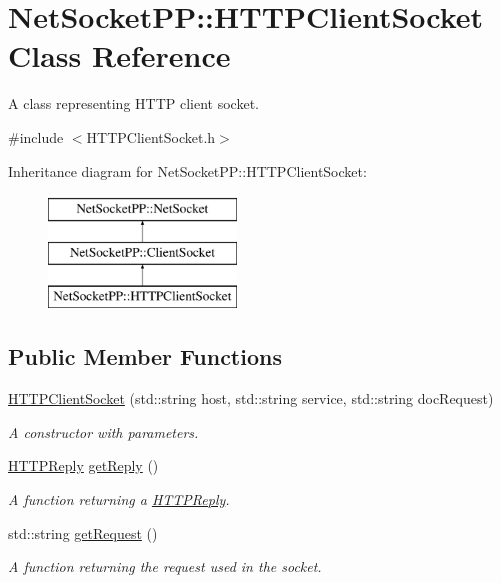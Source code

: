 \hypertarget{class_net_socket_p_p_1_1_h_t_t_p_client_socket}{\section{Net\-Socket\-P\-P\-:\-:H\-T\-T\-P\-Client\-Socket Class Reference}
\label{class_net_socket_p_p_1_1_h_t_t_p_client_socket}
}


A class representing H\-T\-T\-P client socket.  




{\ttfamily \#include $<$H\-T\-T\-P\-Client\-Socket.\-h$>$}

Inheritance diagram for Net\-Socket\-P\-P\-:\-:H\-T\-T\-P\-Client\-Socket\-:\begin{figure}[H]
\begin{center}
\leavevmode
\includegraphics[height=3.000000cm]{class_net_socket_p_p_1_1_h_t_t_p_client_socket}
\end{center}
\end{figure}
\subsection*{Public Member Functions}
\begin{DoxyCompactItemize}
\item 
\hyperlink{class_net_socket_p_p_1_1_h_t_t_p_client_socket_a3512fce741550f229a63d8f6b0914261}{H\-T\-T\-P\-Client\-Socket} (std\-::string host, std\-::string service, std\-::string doc\-Request)
\begin{DoxyCompactList}\small\item\em A constructor with parameters. \end{DoxyCompactList}\item 
\hyperlink{class_net_socket_p_p_1_1_h_t_t_p_reply}{H\-T\-T\-P\-Reply} \hyperlink{class_net_socket_p_p_1_1_h_t_t_p_client_socket_a9693ffad07bdf7916a5dd227146c8bcf}{get\-Reply} ()
\begin{DoxyCompactList}\small\item\em A function returning a \hyperlink{class_net_socket_p_p_1_1_h_t_t_p_reply}{H\-T\-T\-P\-Reply}. \end{DoxyCompactList}\item 
std\-::string \hyperlink{class_net_socket_p_p_1_1_h_t_t_p_client_socket_a710bdbe32e4cdb87b86aa2edd93a1015}{get\-Request} ()
\begin{DoxyCompactList}\small\item\em A function returning the request used in the socket. \end{DoxyCompactList}\end{DoxyCompactItemize}
